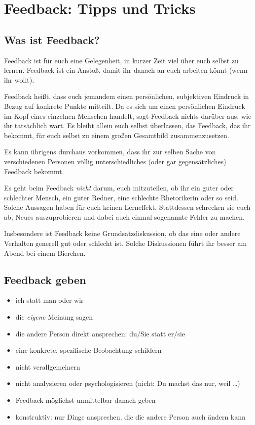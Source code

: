\section{Feedback: Tipps und Tricks}
\label{feedback-regeln}

\subsection{Was ist Feedback?}
Feedback ist für euch eine Gelegenheit, in kurzer Zeit viel über euch selbst zu lernen. Feedback ist ein Anstoß, damit ihr danach an euch arbeiten könnt (wenn ihr wollt).

Feedback heißt, dass euch jemandem einen persönlichen, subjektiven Eindruck in Bezug auf konkrete Punkte mitteilt. Da es sich um einen persönlichen Eindruck im Kopf eines einzelnen Menschen handelt, sagt Feedback nichts darüber aus, wie ihr tatsächlich wart. Es bleibt allein euch selbst überlassen, das Feedback, das ihr bekommt, für euch selbst zu einem großen Gesamtbild zusammenzusetzen.

Es kann übrigens durchaus vorkommen, dass ihr zur selben Sache von verschiedenen Personen völlig unterschiedliches (oder gar gegensätzliches) Feedback bekommt.

Es geht beim Feedback \emph{nicht} darum, euch mitzuteilen, ob ihr ein guter oder schlechter Mensch, ein guter Redner, eine schlechte Rhetorikerin oder so seid. Solche Aussagen haben für euch keinen Lerneffekt. Stattdessen schrecken sie euch ab, Neues auszuprobieren und dabei auch einmal sogenannte Fehler zu machen.

Insbesondere ist Feedback keine Grundsatzdiskussion, ob das eine oder andere Verhalten generell gut oder schlecht ist. Solche Diskussionen führt ihr besser am Abend bei einem Bierchen.

\subsection{Feedback geben}
\begin{itemize}
    \item \glqq ich\grqq{} statt \glqq man\grqq{} oder \glqq wir\grqq
    \item die \emph{eigene} Meinung sagen
    \item die andere Person direkt ansprechen: \glqq du/Sie\grqq{} statt \glqq er/sie\grqq
    \item eine konkrete, spezifische Beobachtung schildern
    \item nicht verallgemeinern
    \item nicht analysieren oder psychologisieren (nicht: \glqq Du machst das nur, weil \ldots\grqq)
    \item Feedback möglichst unmittelbar danach geben
    \item konstruktiv: nur Dinge ansprechen, die die andere Person auch ändern kann
\end{itemize}

